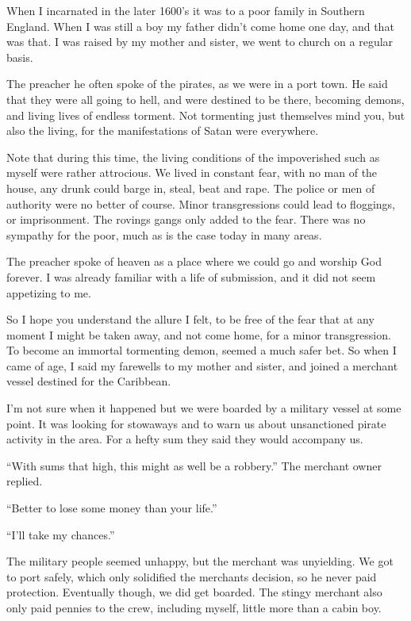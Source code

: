 When I incarnated in the later 1600’s it was to a poor family in Southern England. When I was still a boy my father didn’t come home one day, and that was that.  I was raised by my mother and sister, we went to church on a regular basis.

The preacher he often spoke of the pirates, as we were in a port town.  He said
that they were all going to hell, and were destined to be there, becoming
demons, and living lives of endless torment. Not tormenting just themselves mind
you, but also the living, for the manifestations of Satan were everywhere.

Note that during this time, the living conditions of the impoverished such as myself were rather attrocious. We lived in constant fear, with no man of the house, any drunk could barge in, steal, beat and rape. The police or men of authority were no better of course. Minor transgressions could lead to floggings, or imprisonment. The rovings gangs only added to the fear.  There was no sympathy for the poor, much as is the case today in many areas.

The preacher spoke of heaven as a place where we could go and worship God
forever. I was already familiar with a life of submission, and it did not seem
appetizing to me.

So I hope you understand the allure I felt, to be free of the fear that at any
moment I might be taken away, and not come home, for a minor transgression. To
become an immortal tormenting demon, seemed a much safer bet.  So when I came of
age, I said my farewells to my mother and sister, and joined a merchant vessel
destined for the Caribbean.

I’m not sure when it happened but we were boarded by a military vessel at some point. It was looking for stowaways and to warn us about unsanctioned pirate activity in the area. For a hefty sum they said they would accompany us.

“With sums that high, this might as well be a robbery.” The merchant owner replied.

“Better to lose some money than your life.”

“I’ll take my chances.”

The military people seemed unhappy, but the merchant was unyielding.  We got to port safely, which only solidified the merchants decision, so he never paid protection.  Eventually though, we did get boarded.   The stingy merchant also only paid pennies to the crew, including myself, little more than a cabin boy.

